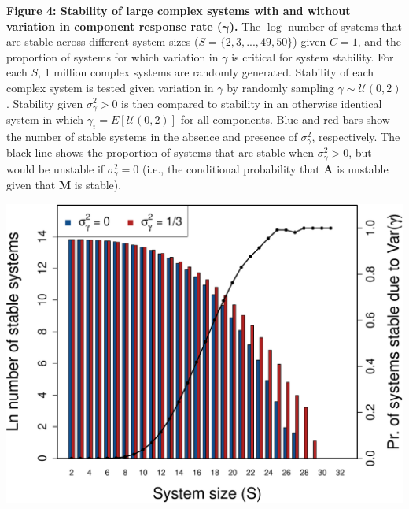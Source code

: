 \documentclass[]{article}
\begin{document}
\clearpage

\textbf{Figure 4: Stability of large complex systems with and without
variation in component response rate (\(\boldsymbol{\gamma}\)).} The
\(\log\) number of systems that are stable across different system sizes
(\(S = \{2, 3, ..., 49, 50 \}\)) given \(C = 1\), and the proportion of
systems for which variation in \(\gamma\) is critical for system
stability. For each \(S\), 1 million complex systems are randomly
generated. Stability of each complex system is tested given variation in
\(\gamma\) by randomly sampling \(\gamma \sim \mathcal{U}(0, 2)\).
Stability given \(\sigma^{2}_{\gamma}>0\) is then compared to stability
in an otherwise identical system in which
\(\gamma_{i} = E[\mathcal{U}(0, 2)]\) for all components. Blue and red
bars show the number of stable systems in the absence and presence of
\(\sigma^{2}_{\gamma}\), respectively. The black line shows the
proportion of systems that are stable when \(\sigma^{2}_{\gamma}>0\),
but would be unstable if \(\sigma^{2}_{\gamma}=0\) (i.e., the
conditional probability that \(\mathbf{A}\) is unstable given that
\(\mathbf{M}\) is stable).

\includegraphics{ms_files/figure-latex/unnamed-chunk-13-1.pdf}
\end{document}
